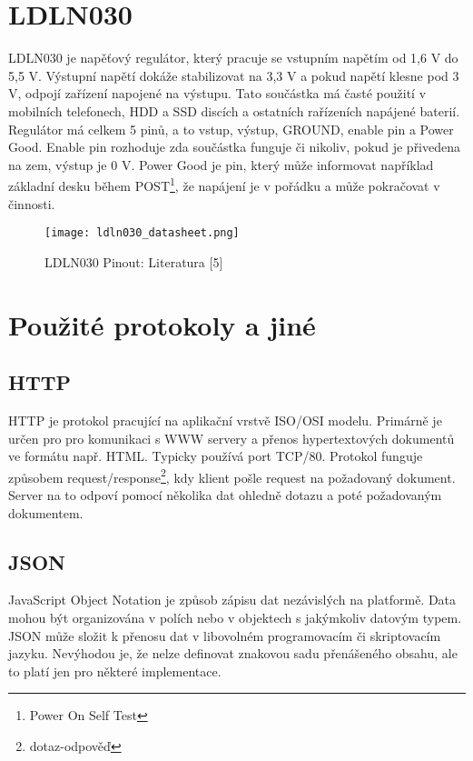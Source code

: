 \documentclass[a4paper, 12pt]{report}
\begin{document}
			\section{LDLN030}
			LDLN030 je napěťový regulátor, který pracuje se vstupním napětím od 1,6 V do 5,5 V. Výstupní napětí dokáže stabilizovat na 3,3 V a pokud napětí klesne pod 3 V, odpojí zařízení napojené na výstupu. Tato součástka má časté použití v mobilních telefonech, HDD a SSD discích a ostatních rařízeních napájené baterií. \\
			Regulátor má celkem 5 pinů, a to vstup, výstup, GROUND, enable pin a Power Good. Enable pin rozhoduje zda součástka funguje či nikoliv, pokud je přivedena na zem, výstup je 0 V. Power Good je pin, který může informovat například základní desku během POST\footnote{Power On Self Test}, že napájení je v pořádku a může pokračovat v činnosti.
			\begin{figure}[h]
				\centering
				\texttt{[image: ldln030\_datasheet.png]}
				\caption{LDLN030 Pinout: Literatura [5]}
				\label{ldln030_datasheet}
			\end{figure}
			\section{Použité protokoly a jiné}
			\subsection{HTTP}
			HTTP je protokol pracující na aplikační vrstvě ISO/OSI modelu. Primárně je určen pro pro komunikaci s WWW servery a přenos hypertextových dokumentů ve formátu např. HTML. Typicky používá port TCP/80. Protokol funguje způsobem request/response\footnote{dotaz-odpověď}, kdy klient pošle request na požadovaný dokument. Server na to odpoví pomocí několika dat ohledně dotazu a poté požadovaným dokumentem.
			\subsection{JSON}
			JavaScript Object Notation je způsob zápisu dat nezávislých na platformě. Data mohou být organizována v polích nebo v objektech s jakýmkoliv datovým typem. JSON může složit k přenosu dat v libovolném programovacím či skriptovacím jazyku. Nevýhodou je, že nelze definovat znakovou sadu přenášeného obsahu, ale to platí jen pro některé implementace.
\end{document}
